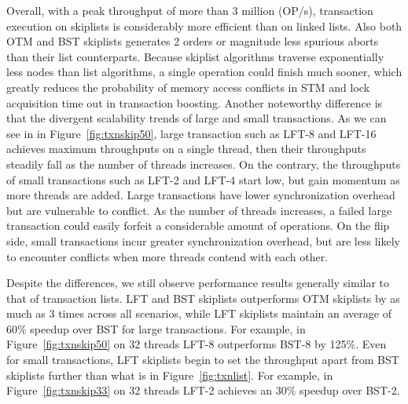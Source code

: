 \documentclass[]{sig-alternate-05-2015}
\begin{document}
Overall, with a peak throughput of more than 3 million (OP/s), transaction execution on skiplists is considerably more efficient than on linked lists.
Also both OTM and BST skiplists generates 2 orders or magnitude less spurious aborts than their list counterparts.
Because skiplist algorithms traverse exponentially less nodes than list algorithms, a single operation could finish much sooner, which greatly reduces the probability of memory access conflicts in STM and lock acquisition time out in transaction boosting.
Another noteworthy difference is that the divergent scalability trends of large and small transactions. 
As we can see in in Figure~\ref{fig:txnskip50}, large transaction such as LFT-8 and LFT-16 achieves maximum throughputs on a single thread, then their throughputs steadily fall as the number of threads increases.
On the contrary, the throughputs of small transactions such as LFT-2 and LFT-4 start low, but gain momentum as more threads are added.
Large transactions have lower synchronization overhead but are vulnerable to conflict.
As the number of threads increases, a failed large transaction could easily forfeit a considerable amount of operations.
On the flip side, small transactions incur greater synchronization overhead, but are less likely to encounter conflicts when more threads contend with each other.

Despite the differences, we still observe performance results generally similar to that of transaction lists.
LFT and BST skiplists outperforms OTM skiplists by as much as 3 times across all scenarios, while LFT skiplists maintain an average of 60\% speedup over BST for large transactions.
For example, in Figure~\ref{fig:txnskip50} on 32 threads LFT-8 outperforms BST-8 by 125\%.
Even for small transactions, LFT skiplists begin to set the throughput apart from BST skiplists further than what is in Figure~\ref{fig:txnlist}.
For example, in Figure~\ref{fig:txnskip33} on 32 threads LFT-2 achieves an 30\% speedup over BST-2.
\end{document}
